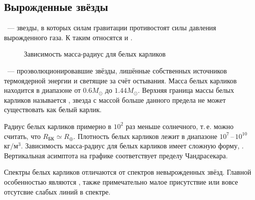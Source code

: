 \subsection{Вырожденные звёзды}
~--- звезды, в которых силам гравитации противостоят силы давления вырожденного газа. К таким относятся  и .

\begin{wrapfigure}[13]{r}{0.38\tw}
    \centering
    \vspace{-1pc}
    \caption{Зависимость масса-радиус для белых карликов}
    \label{pic:mass-radius-wd}
\end{wrapfigure}

~--- проэволюционировавшие звёзды, лишённые собственных источников термоядерной энергии и светящие за счёт остывания. Масса белых карликов находится в диапазоне от $0.6M_{\odot}$ до $1.44 M_{\odot}$. Верхняя граница массы белых карликов называется , звезда с массой больше данного предела не может существовать как белый карлик. 

Радиус белых карликов примерно в $10^2$ раз меньше солнечного, т.\,е. можно считать, что $R_\text{БК} \simeq R_\oplus$. Плотность белых карликов лежит в диапазоне $10^7$\,--\,$10^{10}$~$\text{кг}/\text{м}^3$. Зависимость масса-радиус для белых карликов имеет сложную форму, . Вертикальная асимптота на графике соответствует пределу Чандрасекара. 

Спектры белых карликов отличаются от спектров невырожденных звёзд. Главной особенностью являются , также примечательно малое присутствие или вовсе отсутсвие слабых линий в спектре. 

